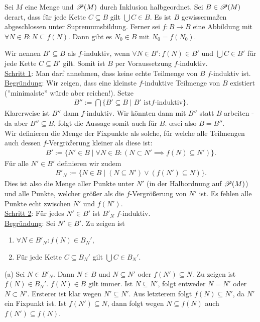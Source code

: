 \documentclass[../../main.tex]{subfiles}
\begin{document}
\begin{lem}\label{12.2.6} Sei $M$ eine Menge und $\mathcal P(M)$ durch Inklusion halbgeordnet. Sei $B\in\mathcal P(M)$ derart, dass für jede Kette $C\subseteq B$ gilt $\bigcup C\in B$. Es ist $B$ gewissermaßen abgeschlossen unter Supremumsbildung. Ferner sei $f: B\rightarrow B$ eine Abbildung mit $\forall N\in B: N\subseteq f(N)$. Dann gibt es $N_0\in B$ mit $N_0=f(N_0)$.
\end{lem}
\begin{cproof}
Wir nennen $B'\subseteq B$ als $f$-induktiv, wenn $\forall N\in B': f(N)\in B'$ und $\bigcup C\in B'$ für jede Kette $C\subseteq B'$ gilt. Somit ist $B$ per Voraussetzung $f$-induktiv.\\		

\noindent\underline{Schritt 1}: Man darf annehmen, dass keine echte Teilmenge von $B$ $f$-induktiv ist.\\
\noindent\underline{Begründung}: Wir zeigen, dass eine kleinste $f$-induktive Teilmenge von $B$ existiert (''minimalste'' würde aber reichen!). Setze
\begin{align*}
B'':=\bigcap\{B'\subseteq B\mid B'\text{ ist}f\text{-induktiv}\}.
\end{align*}
Klarerweise ist $B''$ dann $f$-induktiv. Wir könnten dann mit $B''$ statt $B$ arbeiten - da aber $B''\subseteq B$, folgt die Aussage somit auch für $B$. \oe sei also $B=B''$. \\			
										
\noindent Wir definieren die Menge der Fixpunkte als  solche, für welche alle Teilmengen auch dessen $f$-Vergrößerung kleiner als diese ist:
\begin{align*}
B':=\{N'\in B\mid \forall N\in B: (N\subset N'\implies f(N)\subseteq N')\}.
\end{align*}
Für alle $N'\in B'$ definieren wir zudem
\begin{align*}
B'_N:=\{N\in B\mid(N\subseteq N')\lor(f(N')\subseteq N)\}.
\end{align*}
Dies ist also die Menge aller Punkte unter $N'$ (in der Halbordnung auf $\mathcal P(M)$) und alle Punkte, welcher größer als die $f$-Vergrößerung von $N'$ ist. Es fehlen alle Punkte echt zwischen $N'$ und $f(N')$.\\
					
\noindent\underline{Schritt 2}: Für jedes $N'\in B'$ ist $B'_N$ $f$-induktiv.\\
\noindent\underline{Begründung}: Sei $N'\in B'$. Zu zeigen ist
\begin{enumerate}[\normalfont(b)]
\item $\forall N\in B'_N: f(N)\in B_N'$,
\item Für jede Kette $C\subseteq B_N'$ gilt $\bigcup C\in B_N'$.
\end{enumerate}
(a) Sei $N\in B'_N$. Dann $N\in B$ und $N\subseteq N'$ oder $f(N')\subseteq N$. Zu zeigen ist $f(N)\in B_N'$. $f(N)\in B$ gilt immer. Ist $N\subseteq N'$, folgt entweder $N=N'$ oder $N\subset N'$. Ersterer ist klar wegen $N'\subseteq N'$. Aus letzterem folgt $f(N)\subseteq N'$, da $N'$ ein Fixpunkt ist. Ist $f(N')\subseteq N$, dann folgt wegen $N\subseteq f(N)$ auch $f(N')\subseteq f(N)$.\\


\end{cproof}
\end{document}
